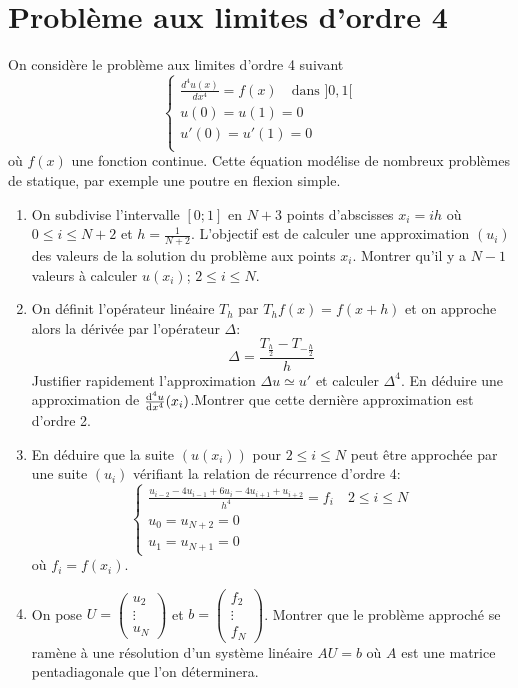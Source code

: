 \documentclass[a4paper]{article}
\def \de {{\rm d}}
\begin{document}
\section{Problème aux limites d'ordre 4}
 On considère le problème aux limites d'ordre 4 suivant
\[\left\{\begin{array}{l}
\frac{d^4u(x)}{dx^4}=f(x)\quad\mbox{dans }]0,1[\\
u(0)=u(1)=0\\
u'(0)=u'(1)=0\\
\end{array}\right.
\]
où $f(x)$ une fonction continue. Cette équation modélise de nombreux problèmes de statique, par exemple une poutre en flexion simple.

\begin{enumerate}
\item On subdivise l'intervalle $[0; 1]$ en $N+3$ points d'abscisses $x_i = ih$ où $0\leq i\leq N+2$ et $h = \frac 1{N+2}$.  L'objectif est de calculer une approximation $(u_i)$ des valeurs de la solution du problème aux points $x_i$. Montrer qu'il y a  $N-1$ valeurs à calculer $u(x_i)$;  $2\leq i\leq N$. 

\item On définit l'opérateur linéaire $T_h$ par $T_hf(x)=f(x+h)$ et on approche alors la dérivée par l'opérateur $\Delta$:
\[\Delta = \frac{T_{\frac h2}-T_{-\frac h2}}{h}\]
Justifier rapidement l'approximation $\Delta u\simeq u'$ et calculer $\Delta^4$. En déduire une approximation de $\frac{\de^4 u}{\de x^4}(x_i)$.Montrer que cette dernière approximation est  d'ordre 2. 

\item En déduire que la suite $(u(x_i))$ pour $2\leq i\leq N$ peut être approchée par une suite $(u_i)$ vérifiant la relation de récurrence d'ordre 4:
\[\left\{\begin{array}{l}
\displaystyle \frac{u_{i-2}-4u_{i-1}+6u_i-4u_{i+1}+u_{i+2}}{h^4}=f_i \quad 2\leq i\leq N\\
u_0=u_{N+2}=0\\
u_1=u_{N+1}=0
\end{array}\right.
\]
où  $f_i=f(x_i)$.
\item On pose $U=\left(\begin{array}{c}  u_2 \\ \vdots \\ u_N \end{array}\right)$ et $b=\left(\begin{array}{c} f_2 \\ \vdots \\ f_N \end{array}\right)$. Montrer que le problème approché se ramène à une résolution d'un système linéaire $A U = b$ où $A$ est une matrice pentadiagonale que l'on déterminera.

\end{enumerate}
\end{document}
